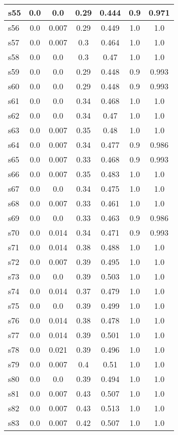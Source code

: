 \documentclass{article}
\begin{document}
\begin{tabular}{|l|c|c|c|c|c|c|}
s55 &0.0 & 0.0 & 0.29 & 0.444 & 0.9 & 0.971\\
\hline
s56 &0.0 & 0.007 & 0.29 & 0.449 & 1.0 & 1.0\\
\hline
s57 &0.0 & 0.007 & 0.3 & 0.464 & 1.0 & 1.0\\
\hline
s58 &0.0 & 0.0 & 0.3 & 0.47 & 1.0 & 1.0\\
\hline
s59 &0.0 & 0.0 & 0.29 & 0.448 & 0.9 & 0.993\\
\hline
s60 &0.0 & 0.0 & 0.29 & 0.448 & 0.9 & 0.993\\
\hline
s61 &0.0 & 0.0 & 0.34 & 0.468 & 1.0 & 1.0\\
\hline
s62 &0.0 & 0.0 & 0.34 & 0.47 & 1.0 & 1.0\\
\hline
s63 &0.0 & 0.007 & 0.35 & 0.48 & 1.0 & 1.0\\
\hline
s64 &0.0 & 0.007 & 0.34 & 0.477 & 0.9 & 0.986\\
\hline
s65 &0.0 & 0.007 & 0.33 & 0.468 & 0.9 & 0.993\\
\hline
s66 &0.0 & 0.007 & 0.35 & 0.483 & 1.0 & 1.0\\
\hline
s67 &0.0 & 0.0 & 0.34 & 0.475 & 1.0 & 1.0\\
\hline
s68 &0.0 & 0.007 & 0.33 & 0.461 & 1.0 & 1.0\\
\hline
s69 &0.0 & 0.0 & 0.33 & 0.463 & 0.9 & 0.986\\
\hline
s70 &0.0 & 0.014 & 0.34 & 0.471 & 0.9 & 0.993\\
\hline
s71 &0.0 & 0.014 & 0.38 & 0.488 & 1.0 & 1.0\\
\hline
s72 &0.0 & 0.007 & 0.39 & 0.495 & 1.0 & 1.0\\
\hline
s73 &0.0 & 0.0 & 0.39 & 0.503 & 1.0 & 1.0\\
\hline
s74 &0.0 & 0.014 & 0.37 & 0.479 & 1.0 & 1.0\\
\hline
s75 &0.0 & 0.0 & 0.39 & 0.499 & 1.0 & 1.0\\
\hline
s76 &0.0 & 0.014 & 0.38 & 0.478 & 1.0 & 1.0\\
\hline
s77 &0.0 & 0.014 & 0.39 & 0.501 & 1.0 & 1.0\\
\hline
s78 &0.0 & 0.021 & 0.39 & 0.496 & 1.0 & 1.0\\
\hline
s79 &0.0 & 0.007 & 0.4 & 0.51 & 1.0 & 1.0\\
\hline
s80 &0.0 & 0.0 & 0.39 & 0.494 & 1.0 & 1.0\\
\hline
s81 &0.0 & 0.007 & 0.43 & 0.507 & 1.0 & 1.0\\
\hline
s82 &0.0 & 0.007 & 0.43 & 0.513 & 1.0 & 1.0\\
\hline
s83 &0.0 & 0.007 & 0.42 & 0.507 & 1.0 & 1.0\\

\end{tabular}
\end{document}
